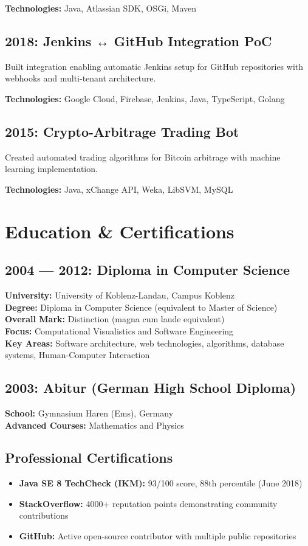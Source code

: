 \documentclass[11pt,a4paper]{article}
\begin{document}
\textbf{Technologies:} Java, Atlassian SDK, OSGi, Maven

\subsection{2018: Jenkins ↔ GitHub Integration PoC}
Built integration enabling automatic Jenkins setup for GitHub repositories with webhooks and multi-tenant architecture.

\textbf{Technologies:} Google Cloud, Firebase, Jenkins, Java, TypeScript, Golang

\subsection{2015: Crypto-Arbitrage Trading Bot}
Created automated trading algorithms for Bitcoin arbitrage with machine learning implementation.

\textbf{Technologies:} Java, xChange API, Weka, LibSVM, MySQL

\newpage

\section{Education \& Certifications}

\subsection{2004 — 2012: Diploma in Computer Science}
\textbf{University:} University of Koblenz-Landau, Campus Koblenz\\
\textbf{Degree:} Diploma in Computer Science (equivalent to Master of Science)\\
\textbf{Overall Mark:} Distinction (magna cum laude equivalent)\\
\textbf{Focus:} Computational Visualistics and Software Engineering\\
\textbf{Key Areas:} Software architecture, web technologies, algorithms, database systems, Human-Computer Interaction

\subsection{2003: Abitur (German High School Diploma)}
\textbf{School:} Gymnasium Haren (Ems), Germany\\
\textbf{Advanced Courses:} Mathematics and Physics

\subsection{Professional Certifications}
\begin{itemize}[leftmargin=12pt,topsep=0pt,itemsep=0pt]
\item \textbf{Java SE 8 TechCheck (IKM):} 93/100 score, 88th percentile (June 2018)
\item \textbf{StackOverflow:} 4000+ reputation points demonstrating community contributions
\item \textbf{GitHub:} Active open-source contributor with multiple public repositories
\end{itemize}
\end{document}
